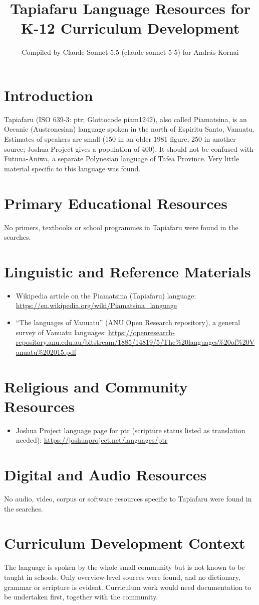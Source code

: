 \documentclass[12pt]{article}
\title{Tapiafaru Language Resources for K-12 Curriculum Development}
\author{Compiled by Claude Sonnet 5.5 (claude-sonnet-5-5) for Andr\'as Kornai}
\date{}
\begin{document}
\maketitle

\section{Introduction}
Tapiafaru (ISO 639-3: ptr; Glottocode piam1242), also called Piamatsina, is an Oceanic (Austronesian) language spoken in the north of Espiritu Santo, Vanuatu. Estimates of speakers are small (150 in an older 1981 figure, 250 in another source; Joshua Project gives a population of 400). It should not be confused with Futuna-Aniwa, a separate Polynesian language of Tafea Province. Very little material specific to this language was found.

\section{Primary Educational Resources}
No primers, textbooks or school programmes in Tapiafaru were found in the searches.

\section{Linguistic and Reference Materials}
\begin{itemize}
\item Wikipedia article on the Piamatsina (Tapiafaru) language: \url{https://en.wikipedia.org/wiki/Piamatsina_language}
\item ``The languages of Vanuatu'' (ANU Open Research repository), a general survey of Vanuatu languages: \url{https://openresearch-repository.anu.edu.au/bitstream/1885/14819/5/The%20languages%20of%20Vanuatu%202015.pdf}
\end{itemize}

\section{Religious and Community Resources}
\begin{itemize}
\item Joshua Project language page for ptr (scripture status listed as translation needed): \url{https://joshuaproject.net/languages/ptr}
\end{itemize}

\section{Digital and Audio Resources}
No audio, video, corpus or software resources specific to Tapiafaru were found in the searches.

\section{Curriculum Development Context}
The language is spoken by the whole small community but is not known to be taught in schools. Only overview-level sources were found, and no dictionary, grammar or scripture is evident. Curriculum work would need documentation to be undertaken first, together with the community.
\end{document}
